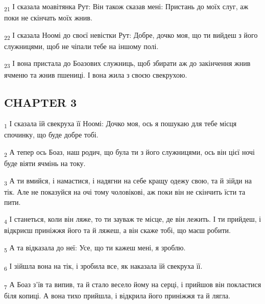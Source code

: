 \begin{tcolorbox}
\textsubscript{21} І сказала моавітянка Рут: Він також сказав мені: Пристань до моїх слуг, аж поки не скінчать моїх жнив.
\end{tcolorbox}
\begin{tcolorbox}
\textsubscript{22} І сказала Ноомі до своєї невістки Рут: Добре, дочко моя, що ти вийдеш з його служницями, щоб не чіпали тебе на іншому полі.
\end{tcolorbox}
\begin{tcolorbox}
\textsubscript{23} І вона пристала до Боазових служниць, щоб збирати аж до закінчення жнив ячменю та жнив пшениці. І вона жила з своєю свекрухою.
\end{tcolorbox}
\subsection{CHAPTER 3}
\begin{tcolorbox}
\textsubscript{1} І сказала їй свекруха її Ноомі: Дочко моя, ось я пошукаю для тебе місця спочинку, що буде добре тобі.
\end{tcolorbox}
\begin{tcolorbox}
\textsubscript{2} А тепер ось Боаз, наш родич, що була ти з його служницями, ось він цієї ночі буде віяти ячмінь на току.
\end{tcolorbox}
\begin{tcolorbox}
\textsubscript{3} А ти вмийся, і намастися, і надягни на себе кращу одежу свою, та й зійди на тік. Але не показуйся на очі тому чоловікові, аж поки він не скінчить їсти та пити.
\end{tcolorbox}
\begin{tcolorbox}
\textsubscript{4} І станеться, коли він ляже, то ти зауваж те місце, де він лежить. І ти прийдеш, і відкриєш приніжжя його та й ляжеш, а він скаже тобі, що маєш робити.
\end{tcolorbox}
\begin{tcolorbox}
\textsubscript{5} А та відказала до неї: Усе, що ти кажеш мені, я зроблю.
\end{tcolorbox}
\begin{tcolorbox}
\textsubscript{6} І зійшла вона на тік, і зробила все, як наказала їй свекруха її.
\end{tcolorbox}
\begin{tcolorbox}
\textsubscript{7} А Боаз з'їв та випив, та й стало весело йому на серці, і прийшов він покластися біля копиці. А вона тихо прийшла, і відкрила його приніжжя та й лягла.
\end{tcolorbox}
